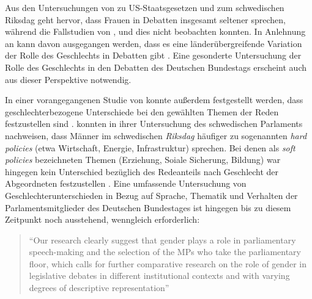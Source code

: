 \documentclass[12pt, 
    twoside=false, 
    bibliography=totoc, 
    numbers=endperiod, 
    headings=normal, 
    toc=chapterentrydotfill
    ]{scrbook}
\begin{document}
Aus den Untersuchungen von \textcite{kathlene_1994} zu US-Staatsgesetzen und \textcite{back_2014} zum schwedischen Riksdag geht hervor, dass Frauen in Debatten insgesamt seltener sprechen, während die Fallstudien von \textcite{broughton_1999}, \textcite{murray_2010} und \textcite{wang_2014} dies nicht beobachten konnten. In Anlehnung an \textcite{back_2018} kann davon ausgegangen werden, dass es eine länderübergreifende Variation der Rolle des Geschlechts in Debatten gibt \parencite[2]{back_2018}. Eine gesonderte Untersuchung der Rolle des Geschlechts in den Debatten des Deutschen Bundestags erscheint auch aus dieser Perspektive notwendig. 

In einer vorangegangenen Studie von \textcite{back_2014} konnte außerdem festgestellt werden, dass geschlechterbezogene Unterschiede bei den gewählten Themen der Reden festzustellen sind \parencite[514f.]{back_2014}. \textcite{back_2014} konnten in ihrer Untersuchung des schwedischen Parlaments nachweisen, dass Männer im schwedischen \emph{Riksdag} häufiger zu sogenannten \emph{hard policies} (etwa Wirtschaft, Energie, Infrastruktur) sprechen. Bei denen als \emph{soft policies} bezeichneten Themen (Erziehung, Soiale Sicherung, Bildung) war hingegen kein Unterschied bezüglich des Redeanteils nach Geschlecht der Abgeordneten festzustellen \parencite[514f.]{back_2014}. Eine umfassende Untersuchung von Geschlechterunterschieden in Bezug auf Sprache, Thematik und Verhalten der Parlamentsmitglieder des Deutschen Bundestages ist hingegen bis zu diesem Zeitpunkt noch ausstehend, wenngleich erforderlich: 

\citereset
\begin{quote}
 \enquote{Our research clearly suggest that gender plays a role in parliamentary speech-making and the selection of the MPs who take the parliamentary floor, which calls for further comparative research on the role of gender in legislative debates in different institutional contexts and with varying degrees of descriptive representation}
  \parencite[515]{back_2014}
\end{quote}

\end{document}
